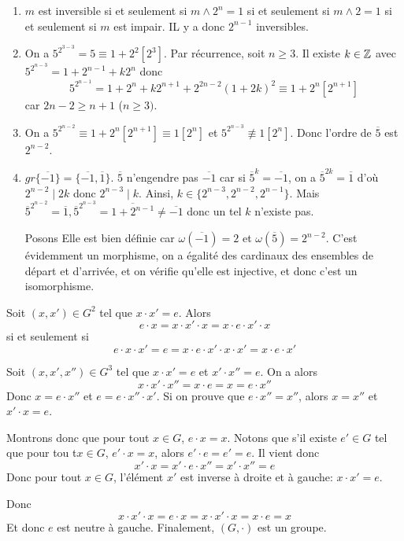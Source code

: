 \begin{solution}
	\phantom{}
	\begin{enumerate}
		\item $m$ est inversible si et seulement si $m\wedge 2^{n}=1$ si et seulement si $m\wedge 2=1$ si et seulement si $m$ est impair. IL y a donc $2^{n-1}$ inversibles.
		\item On a $5^{2^{3-3}}=5\equiv1+2^{2}[2^{3}]$. Par récurrence, soit $n\geqslant3$. Il existe $k\in\mathbb{Z}$ avec $5^{2^{n-3}}=1+2^{n-1}+k2^{n}$ donc 
		$$5^{2^{n-1}}=1+2^{n}+k2^{n+1}+2^{2n-2}(1+2k)^{2}\equiv 1+2^{n}[2^{n+1}]$$
		car $2n-2\geqslant n+1$ ($n\geqslant3)$.

		\item On a $5^{2^{n-2}}\equiv 1+2^{n}[2^{n+1}]\equiv 1[2^{n}]$ et $5^{2^{n-3}}\not\equiv1[2^{n}]$. Donc l'ordre de $\overline{5}$ est $2^{n-2}$. 
		
		\item $gr\{\overline{-1}\}=\{\overline{-1},\overline{1}\}$. $\overline{5}$ n'engendre pas $\overline{-1}$ car si $\overline{5}^{k}=\overline{-1}$, on a $\overline{5}^{2k}=\overline{1}$ d'où $2^{n-2}\mid 2k$ donc $2^{n-3}\mid k$. Ainsi, $k\in\{2^{n-3},2^{n-2},2^{n-1}\}$. Mais $\overline{5}^{2^{n-2}}=\overline{1},\overline{5}^{2^{n-3}}=\overline{1+2^{n-1}}\neq\overline{-1}$ donc un tel $k$ n'existe pas.
		
		Posons 
		Elle est bien définie car $\omega(\overline{-1})=2$ et $\omega(\overline{5})=2^{n-2}$. C'est évidemment un morphisme, on a égalité des cardinaux des ensembles de départ et d'arrivée, et on vérifie qu'elle est injective, et donc c'est un isomorphisme.
	\end{enumerate}
\end{solution}

\begin{solution}
	Soit $(x,x')\in G^{2}$ tel que $x\cdot x'=e$. Alors 
	$$e\cdot x=x\cdot x'\cdot x =x\cdot e\cdot x'\cdot x$$
	si et seulement si 
	$$e\cdot x\cdot x'=e=x\cdot e\cdot x'\cdot x\cdot x'=x\cdot e \cdot	x'$$

	Soit $(x,x',x'')\in G^{3}$ tel que $x\cdot x'=e$ et $x'\cdot x''=e$. On a alors 
	$$x\cdot x'\cdot x''=x\cdot e = x = e\cdot x''$$
	Donc $x=e\cdot x''$ et $e=e\cdot x''\cdot x'$. Si on prouve que $e\cdot x''=x''$, alors $x=x''$ et $x'\cdot x=e$.

	Montrons donc que pour tout $x\in G$, $e\cdot x=x$. Notons que s'il existe $e'\in G$ tel que pour tou t$x\in G$, $e'\cdot x=x$, alors $e'\cdot e=e'=e$.
	Il vient donc 
	$$x'\cdot x=x'\cdot e\cdot x''=x'\cdot x''=e$$
	Donc pour tout $x\in G$, l'élément $x'$ est inverse à droite et à gauche: $x\cdot x'=e$.

	Donc 
	$$x\cdot x'\cdot x=e\cdot x =x\cdot x'\cdot x=x\cdot e=x$$
	Et donc $e$ est neutre à gauche. Finalement, $(G,\cdot)$ est un groupe.
\end{solution}

